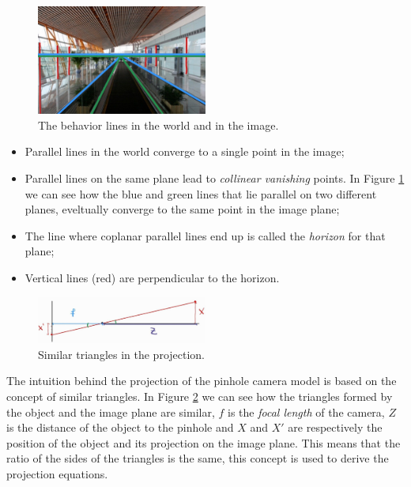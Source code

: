 \begin{figure}[H]
    \centering
    \includegraphics[width=0.5\textwidth]{Figures/horizon.jpg}
    \caption{The behavior lines in the world and in the image.}
    \label{fig:horizon}
\end{figure}
\begin{itemize}
    \item Parallel lines in the world converge to a single point in the image;
    \item Parallel lines on the same plane lead to \textit{collinear vanishing} points. In Figure \ref{fig:horizon} we can see how the blue and green lines that lie parallel on two different planes, eveltually converge to the same point in the image plane;
    \item The line where coplanar parallel lines end up is called the \textit{horizon} for that plane;
    \item Vertical lines (red) are perpendicular to the horizon.
\end{itemize}

\begin{figure}[H]
    \centering
    \includegraphics[width=0.5\textwidth]{Figures/triangles.jpg}
    \caption{Similar triangles in the projection.}
    \label{fig:triangles}
\end{figure}

The intuition behind the projection of the pinhole camera model is based on the concept of similar triangles. In Figure \ref{fig:triangles} we can see how the triangles formed by the object and the image plane are similar, \(f\) is the \textit{focal length} of the camera, \(Z\) is the distance of the object to the pinhole and \(X\) and \(X'\) are respectively the position of the object and its projection on the image plane. This means that the ratio of the sides of the triangles is the same, this concept is used to derive the projection equations. 


